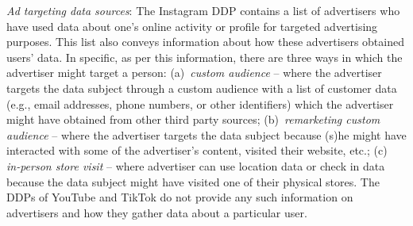 \noindent
\textit{Ad targeting data sources}: The Instagram DDP contains a list of advertisers who have used data about one's online activity or profile for targeted advertising purposes.
This list also conveys information about how these advertisers obtained users' data.
In specific, as per this information, there are three ways in which the advertiser might target a person: (a)~\textit{custom audience} -- where the advertiser targets the data subject through a custom audience with a list of customer data (e.g., email addresses, phone numbers, or other identifiers) which the advertiser might have obtained from other third party sources; (b)~\textit{remarketing custom audience} -- where the advertiser targets the data subject because (s)he might have interacted with some of the advertiser's content, visited their website, etc.; (c)~ \textit{in-person store visit} -- where advertiser can use location data or check in data because the data subject might have visited one of their physical stores. 
The DDPs of YouTube and TikTok do not provide any such information on advertisers and how they gather data about a particular user.

